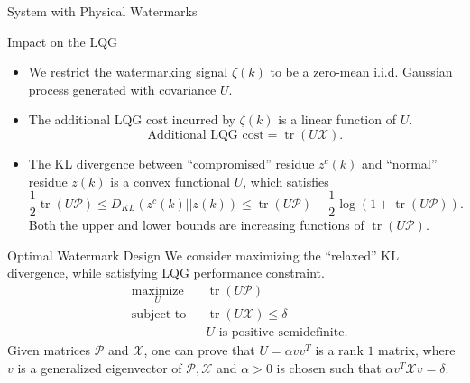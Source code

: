 \documentclass[10pt]{beamer}
\newcommand{\tikzdir}[1]{#1.tikz}
\newcommand{\inputtikz}[1]{}}
\DeclareMathOperator{\tr}{tr}
\begin{document}
\begin{frame}{System with Physical Watermarks}
    \begin{figure}[htpb]
      \begin{center}
	\inputtikz{replaywithphywatermark}
      \end{center}
    \end{figure}
\end{frame}

\begin{frame}{Impact on the LQG}
  \begin{itemize}
  \item We restrict the watermarking signal $\zeta(k)$ to be a zero-mean i.i.d. Gaussian process generated with covariance $U$.
  \item The additional LQG cost incurred by $\zeta(k)$ is a linear function of $U$.
    \begin{displaymath}
      \text{Additional LQG cost} = \tr(U\mathcal X).
    \end{displaymath}
  \item The KL divergence between ``compromised'' residue $z^c(k)$ and ``normal'' residue $z(k)$ is a convex functional $U$, which satisfies
    \begin{displaymath}
      \frac{1}{2}\tr(U\mathcal P) \leq D_{KL}(z^c(k)||z(k))\leq \tr(U\mathcal P)-\frac{1}{2}\log(1+\tr(U\mathcal P)).
    \end{displaymath}
    Both the upper and lower bounds are increasing functions of $\tr(U\mathcal P)$.
  \end{itemize}
\end{frame}

  \begin{frame}{Optimal Watermark Design}
    We consider maximizing the ``relaxed'' KL divergence, while satisfying LQG performance constraint.
    \begin{align*}
      &\mathop{\textrm{maximize}}\limits_{U}&
      & \tr (U\mathcal P)\\
      &\textrm{subject to}&
      & \tr (U\mathcal X) \leq \delta \\
      &&& U \text{ is positive semidefinite.}
    \end{align*}
    Given matrices $\mathcal P$ and $\mathcal X$, one can prove that $U = \alpha v v^T$ is a rank $1$ matrix, where $v$ is a generalized eigenvector of $\mathcal P,\mathcal X$ and $\alpha >0$ is chosen such that $ \alpha v^T\mathcal X v =\delta$.
  \end{frame}
\end{document}
